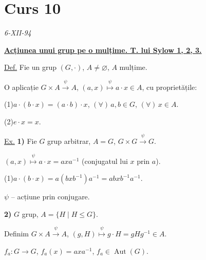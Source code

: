 
\newpage
\section{Curs 10}


\begin{center}
\end{center}
\begin{flushright}
\textit{6-XII-94}
\end{flushright}

\bigskip
\noindent\underline{\textbf{Acțiunea unui grup pe o mulțime. T. lui Sylow 1, 2, 3.}}

\bigskip
\noindent\underline{Def.} Fie un grup $(G,\cdot)$, $A\neq\varnothing$, $A$ mulțime.

\noindent O aplicație $G\times A\xrightarrow{\ \psi\ } A$,
\quad $(a,x)\overset{\psi}{\longmapsto}a\cdot x\in A$, cu proprietățile:

\bigskip
\noindent (1)\quad $a\cdot(b\cdot x)=(a\cdot b)\cdot x$,
\quad $(\forall)\,a,b\in G$, \quad $(\forall)\,x\in A$.

\medskip
\noindent (2)\quad $e\cdot x=x$.

\bigskip
\noindent\underline{Ex.} \textbf{1)} Fie $G$ grup arbitrar, $A=G$,
\quad $G\times G\xrightarrow{\ \psi\ }G$.

\noindent $(a,x)\overset{\psi}{\longmapsto}a\cdot x=axa^{-1}$
(conjugatul lui $x$ prin $a$).

\bigskip
\noindent (1)\quad $a\cdot(b\cdot x)=a(bxb^{-1})a^{-1}=abxb^{-1}a^{-1}$.

\medskip
\begin{center}
\end{center}

\noindent $\psi$ -- acțiune prin conjugare.

\bigskip
\noindent\textbf{2)} $G$ grup, \quad $A=\{H\mid H\leq G\}$.

\noindent Definim $G\times A\xrightarrow{\ \psi\ }A$,
\quad $(g,H)\overset{\psi}{\longmapsto}g\cdot H=gHg^{-1}\in A$.

\bigskip
\noindent $f_a:G\longrightarrow G$, \quad $f_a(x)=axa^{-1}$,
\quad $f_a\in\operatorname{Aut}(G)$.

